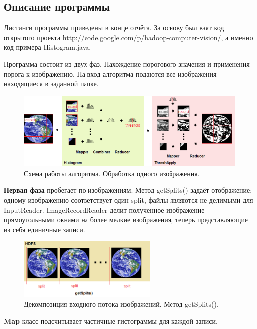\documentclass[12pt,a4paper]{extarticle} %
\begin{document}
\subsection{Описание программы}
    Листинги программы приведены в конце отчёта. За основу был взят код открытого проекта \href{http://code.google.com/p/hadoop-computer-vision/}{http://code.google.com/p/hadoop-computer-vision/}, а именно код примера Histogram.java.

    Программа состоит из двух фаз. Нахождение порогового значения и применения порога к изображению. На вход алгоритма подаются все изображения находящиеся в заданной папке. 

	\begin{figure}[h]
		 \centering
		 \includegraphics[width=\textwidth]{images/mapreducejob.png}
		 \caption{Схема работы алгоритма. Обработка одного изображения.}
	\end{figure}

    \textbf{Первая фаза} пробегает по изображениям. Метод getSplits() задаёт отображение: одному изображению соответствует один split, файлы являются не делимыми для InputReader. ImageRecordReader делит полученное изображение прямоугольными окнами на более мелкие изображения, теперь представляющие из себя единичные записи.\\[5pt]

	\begin{figure}[h]
		 \centering
		 \includegraphics[width=0.6\textwidth]{images/getsplits.png}
		 \caption{Декомпозиция входного потока изображений. Метод getSplits().}
	\end{figure}

    \noindent \textbf{Map} класс подсчитывает частичные гистограммы для каждой записи. 
\end{document}
